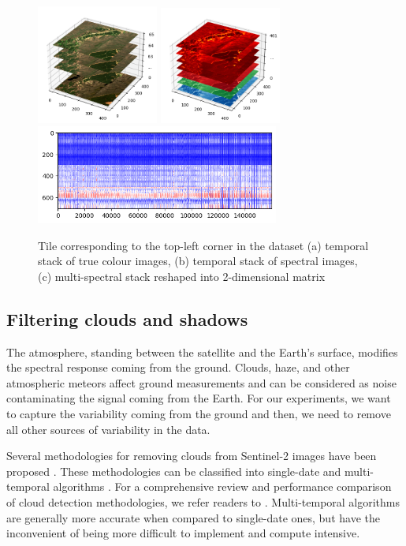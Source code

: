 \documentclass[essd, manuscript]{copernicus}
\begin{document}
\begin{figure}%
    {{\includegraphics[width=4cm]{fig2a.png} }}%
    {{\includegraphics[width=4cm]{fig2b.png} }}%
    {{\includegraphics[width=8cm]{fig2c.png} }}%
    \caption{Tile corresponding to the top-left corner in the dataset (a) temporal stack of true colour images, (b) temporal stack of spectral images, (c) multi-spectral stack reshaped into 2-dimensional matrix}%
    \label{dataset_detail}%
\end{figure}

\subsection{Filtering clouds and shadows}
The atmosphere, standing between the satellite and the Earth's surface, modifies the spectral response coming from the ground. Clouds, haze, and other atmospheric meteors affect ground measurements and can be considered as noise contaminating the signal coming from the Earth. For our experiments, we want to capture the variability coming from the ground and then, we need to remove all other sources of variability in the data.

Several methodologies for removing clouds from Sentinel-2 images have been proposed \citep{louis2016sentinel,hagolle2017maja,qiu2019fmask}. These methodologies can be classified into single-date and multi-temporal algorithms \citep{}. For a comprehensive review and performance comparison of cloud detection methodologies, we refer readers to \citep{zhu2018cloud}. Multi-temporal algorithms are generally more accurate when compared to single-date ones, but have the inconvenient of being more difficult to implement and compute intensive.
\end{document}
